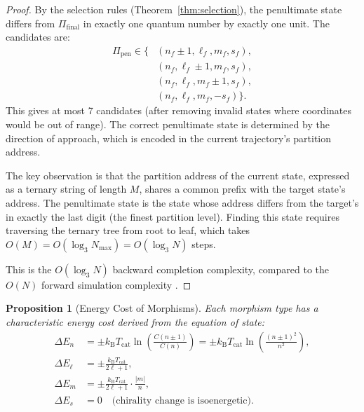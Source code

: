 \documentclass[twocolumn,10pt]{article}
\newtheorem{proposition}[theorem]{Proposition}
\newcommand{\kB}{k_{\mathrm{B}}}
\newcommand{\Tcat}{T_{\mathrm{cat}}}
\newcommand{\Nmax}{N_{\mathrm{max}}}
\begin{document}
\begin{proof}
By the selection rules (Theorem~\ref{thm:selection}), the penultimate state differs from $\Pi_{\mathrm{final}}$ in exactly one quantum number by exactly one unit. The candidates are:
\begin{align}
\Pi_{\mathrm{pen}} \in \{&(n_f \pm 1, \ell_f, m_f, s_f), \nonumber\\
&(n_f, \ell_f \pm 1, m_f, s_f), \nonumber\\
&(n_f, \ell_f, m_f \pm 1, s_f), \nonumber\\
&(n_f, \ell_f, m_f, -s_f)\}.
\end{align}
This gives at most 7 candidates (after removing invalid states where coordinates would be out of range). The correct penultimate state is determined by the direction of approach, which is encoded in the current trajectory's partition address.

The key observation is that the partition address of the current state, expressed as a ternary string of length $M$, shares a common prefix with the target state's address. The penultimate state is the state whose address differs from the target's in exactly the last digit (the finest partition level). Finding this state requires traversing the ternary tree from root to leaf, which takes $O(M) = O(\log_3 \Nmax) = O(\log_3 N)$ steps.

This is the $O(\log_3 N)$ backward completion complexity, compared to the $O(N)$ forward simulation complexity \cite{sachikonye2026backward, sachikonye2026poincare}.
\end{proof}

\begin{proposition}[Energy Cost of Morphisms]\label{prop:energy_cost}
Each morphism type has a characteristic energy cost derived from the equation of state:
\begin{align}
\Delta E_n &= \pm \kB \Tcat \ln\left(\frac{C(n \pm 1)}{C(n)}\right) = \pm \kB \Tcat \ln\left(\frac{(n \pm 1)^2}{n^2}\right), \label{eq:energy_n}\\
\Delta E_{\ell} &= \pm \frac{\kB \Tcat}{2\ell + 1}, \label{eq:energy_l}\\
\Delta E_m &= \pm \frac{\kB \Tcat}{2\ell + 1} \cdot \frac{|m|}{n}, \label{eq:energy_m}\\
\Delta E_s &= 0 \quad \text{(chirality change is isoenergetic)}. \label{eq:energy_s}
\end{align}
\end{proposition}
\end{document}
